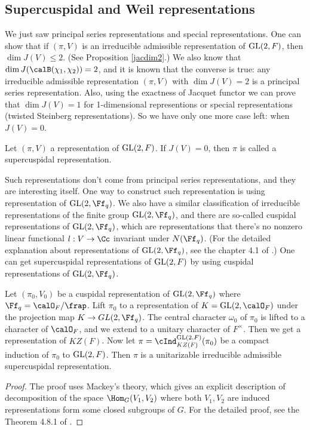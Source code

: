 \subsection{Supercuspidal and Weil representations}
We just saw principal series representations and special representations. One can show that if $(\pi, V)$  is an irreducible admissible representation of $\mathrm{GL}(2, F)$, then $\dim J(V) \leq 2$. (See Proposition \ref{jacdim2}.) 
We also know that $\dim J(\calB(\chi_1, \chi_2)) = 2$, and it is known that the converse is true: any irreducible admissible representation $(\pi, V)$ with $\dim J(V) = 2$ is a principal series representation. 
Also, using the exactness of Jacquet functor we can prove that $\dim J(V) = 1$ for 1-dimensional representions or special representations (twisted Steinberg representations).  
So we have only one more case left: when $J(V) = 0$. 
\begin{definition}
Let $(\pi, V)$ a representation of $\mathrm{GL}(2, F)$. If $J(V) = 0$, then $\pi$ is called a supercuspidal representation. 
\end{definition}

Such representations don't come from principal series representations, and they are interesting itself. 
One way to construct such representation is using representation of $\GL(2, \Ff_{q})$. 
We also have a similar classification of irreducible representations of the finite group $\GL(2, \Ff_{q})$, 
and there are so-called cuspidal representations of $\GL(2, \Ff_{q})$, which are representations that there's no nonzero linear functional $l:V\to \Cc$ invariant under $N(\Ff_{q})$.  (For the detailed explanation about representations of $\GL(2, \Ff_{q})$, see the chapter 4.1 of \cite{bu}.) 
One can get supercuspidal representations of $\mathrm{GL}(2, F)$ by using cuspidal representations of $\GL(2, \Ff_{q})$. 
\begin{theorem}
Let $(\pi_0, V_0)$ be a cuspidal representation of $\GL(2, \Ff_{q})$ where $\Ff_{q}= \calO_{F}/ \frap$. Lift $\pi_{0}$ to a representation of $K = \GL(2, \calO_{F})$ under the projection map $K \to GL(2, \Ff_{q})$. 
The central character $\omega_0$ of $\pi_{0}$ is lifted to a character of $\calO_{F}$, and we extend to a unitary character of $F^{\times}$. 
Then we get a representation of $KZ(F)$. Now let $\pi = \cInd_{KZ(F)}^{\GL(2, F)} (\pi_{0})$ be a compact induction of $\pi_0$ to $\mathrm{GL}(2, F)$. 
Then $\pi$ is a unitarizable irreducible admissible supercuspidal representation. 
\end{theorem}
\begin{proof}
The proof uses Mackey's theory, which gives an explicit description of decomposition of the space $\Hom_{G}(V_{1}, V_{2})$ where both $V_{1}, V_{2}$ are induced representations form some closed subgroups of $G$. For the detailed proof, see the Theorem 4.8.1 of \cite{bu}. 
\end{proof}

